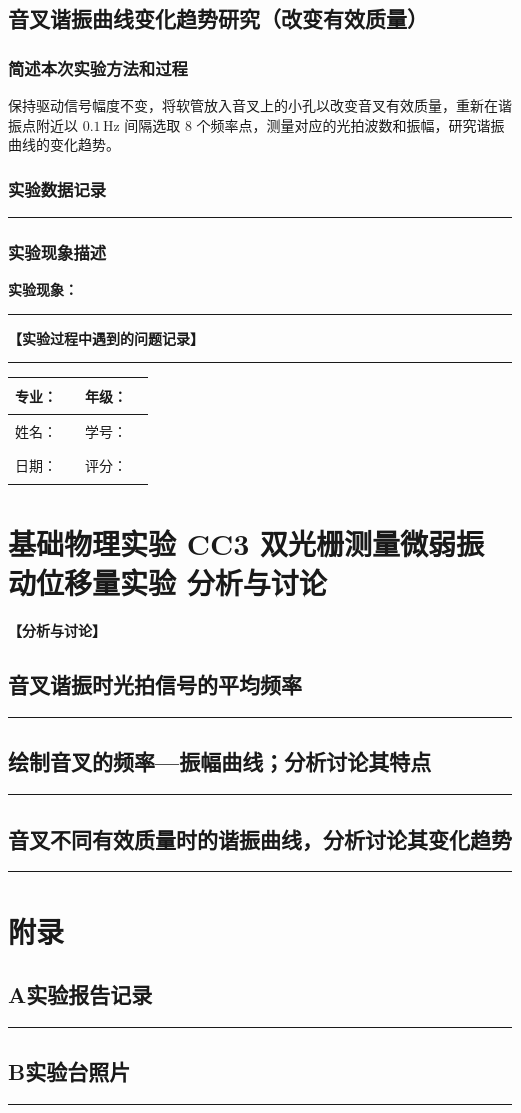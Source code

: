\documentclass[dvipsnames, svgnames,a4paper,11pt]{article}
\newcommand{\recordblank}[1]{%
  \par\noindent\rule{0.95\linewidth}{0pt}\rule{0pt}{#1}\par}
\begin{document}
\subsection{音叉谐振曲线变化趋势研究（改变有效质量）}
\subsubsection{简述本次实验方法和过程}

保持驱动信号幅度不变，将软管放入音叉上的小孔以改变音叉有效质量，重新在谐振点附近以 $0.1\,\text{Hz}$ 间隔选取 8 个频率点，测量对应的光拍波数和振幅，研究谐振曲线的变化趋势。

\subsubsection{实验数据记录}
\recordblank{5.5cm}
\subsubsection{实验现象描述}
\noindent\textbf{实验现象：}\par
\recordblank{4.5cm}
\textbf{【实验过程中遇到的问题记录】}
\recordblank{5cm}
\clearpage
\begin{table}
	\renewcommand\arraystretch{1.7}
	\begin{tabularx}{\textwidth}{|X|X|X|X|}
	\hline
	专业：& \rule{2.5cm}{0.4pt} & 年级：& \rule{2.5cm}{0.4pt}\\
	\hline
	姓名：& \rule{2.5cm}{0.4pt} & 学号：& \rule{3cm}{0.4pt}\\
	\hline
	日期：& \rule{3cm}{0.4pt} & 评分：& \rule{3cm}{0.4pt}\\
	\hline
	\end{tabularx}
\end{table}

\section{基础物理实验  \quad  CC3 双光栅测量微弱振动位移量实验 \quad 分析与讨论}
\textbf{【分析与讨论】}
\subsection{音叉谐振时光拍信号的平均频率}
\recordblank{3.2cm}
\subsection{绘制音叉的频率—振幅曲线；分析讨论其特点}
\recordblank{3.2cm}
\subsection{音叉不同有效质量时的谐振曲线，分析讨论其变化趋势}
\recordblank{3.2cm}
\clearpage
\appendix
\renewcommand{\appendixname}{附录}
\section*{附录}

\subsection*{A\quad 实验报告记录}
\recordblank{5.5cm}
\subsection*{B\quad 实验台照片}
\recordblank{5.5cm}
\end{document}
